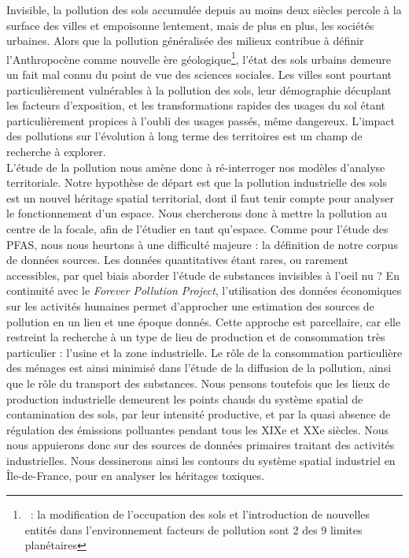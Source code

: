 \documentclass[a4paper,twoside,12pt]{book}
\begin{document}
Invisible, la pollution des sols accumulée depuis au moins deux siècles percole à la surface des villes et empoisonne lentement, mais de plus en plus, les sociétés urbaines. Alors que la pollution généralisée des milieux contribue à définir l’Anthropocène comme nouvelle ère géologique\footnote{\cite{rockstrom_safe_2009} : la modification de l’occupation des sols et l’introduction de nouvelles entités dans l’environnement facteurs de pollution sont 2 des 9 limites planétaires}, l’état des sols urbains demeure un fait mal connu du point de vue des sciences sociales. Les villes sont pourtant particulièrement vulnérables à la pollution des sols, leur démographie décuplant les facteurs d’exposition, et les transformations rapides des usages du sol étant particulièrement propices à l’oubli des usages passés, même dangereux. L'impact des pollutions sur l'évolution à long terme des territoires est un champ de recherche à explorer. \\

L'étude de la pollution nous amène donc à ré-interroger nos modèles d'analyse territoriale. Notre hypothèse de départ est que la pollution industrielle des sols est un nouvel héritage spatial territorial, dont il faut tenir compte pour analyser le fonctionnement d'un espace. Nous chercherons donc à mettre la pollution au centre de la focale, afin de l'étudier en tant qu'espace. Comme pour l'étude des PFAS, nous nous heurtons à une difficulté majeure : la définition de notre corpus de données sources. Les données quantitatives étant rares, ou rarement accessibles, par quel biais aborder l'étude de substances invisibles à l'oeil nu ? En continuité avec le \textit{Forever Pollution Project}, l'utilisation des données économiques sur les activités humaines permet d'approcher une estimation des sources de pollution en un lieu et une époque donnés. Cette approche est parcellaire, car elle restreint la recherche à  un type de lieu de production et de consommation très particulier : l'usine et la zone industrielle. Le rôle de la consommation particulière des ménages est ainsi minimisé dans l'étude de la diffusion de la pollution, ainsi que le rôle du transport des substances. Nous pensons toutefois que les lieux de production industrielle demeurent les points chauds du système spatial de contamination des sols, par leur intensité productive, et par la quasi absence de régulation des émissions polluantes pendant tous les XIXe et XXe siècles. Nous nous appuierons donc sur des sources de données primaires traitant des activités industrielles. Nous dessinerons ainsi les contours du système spatial industriel en Île-de-France, pour en analyser les héritages toxiques. \\
\end{document}
